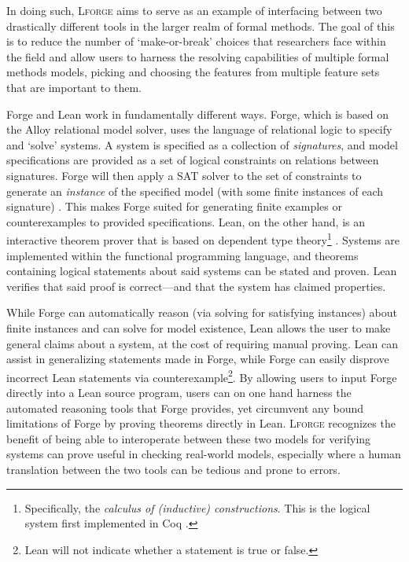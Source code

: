 In doing such, \textsc{Lforge} aims to serve as an example of interfacing between two drastically different tools in the larger realm of formal methods. The goal of this is to reduce the number of `make-or-break' choices that researchers face within the field and allow users to harness the resolving capabilities of multiple formal methods models, picking and choosing the features from multiple feature sets that are important to them. 

Forge and Lean work in fundamentally different ways. Forge, which is based on the Alloy relational model solver, uses the language of relational logic to specify and `solve' systems. A system is specified as a collection of \emph{signatures}, and model specifications are provided as a set of logical constraints on relations between signatures. Forge will then apply a SAT solver to the set of constraints to generate an \emph{instance} of the specified model (with some finite instances of each signature) \cite{jackson2019alloy,ngpdbccdlrrvwwk-oopsla-2024}. This makes Forge suited for generating finite examples or counterexamples to provided specifications. Lean, on the other hand, is an interactive theorem prover that is based on dependent type theory\footnote{Specifically, the \emph{calculus of (inductive) constructions}. This is the logical system first implemented in Coq \cite{bertot2008short}.} \cite{avigad2024theorem}. Systems are implemented within the functional programming language, and theorems containing logical statements about said systems can be stated and proven. Lean verifies that said proof is correct---and that the system has claimed properties.

While Forge can automatically reason (via solving for satisfying instances) about finite instances and can solve for model existence, Lean allows the user to make general claims about a system, at the cost of requiring manual proving. Lean can assist in generalizing statements made in Forge, while Forge can easily disprove incorrect Lean statements via counterexample\footnote{Lean will not indicate whether a statement is true or false.}. By allowing users to input Forge directly into a Lean source program, users can on one hand harness the automated reasoning tools that Forge provides, yet circumvent any bound limitations of Forge by proving theorems directly in Lean. \textsc{Lforge} recognizes the benefit of being able to interoperate between these two models for verifying systems can prove useful in checking real-world models, especially where a human translation between the two tools can be tedious and prone to errors. 

